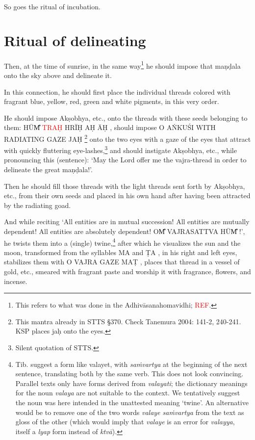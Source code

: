 \documentclass[11pt]{book}
\makeatletter
\def\fakesc#1{%
  \begingroup%
  \xdef\fake@name{\csname\curr@fontshape/\f@size\endcsname}%
  \fontsize{1.3\fontdimen8\fake@name}{\baselineskip}\selectfont%
  \uppercase{#1}%
  \endgroup%
}
\newcommand{\mantra}[1]{\fakesc{#1}}
\newcommand{\red}[1]{\textcolor{red}{#1}}
\newcommand{\skt}[1]{\emph{#1}}
\makeatother
\begin{document}
So goes the ritual of incubation.

\section{Ritual of delineating}

Then, at the time of sunrise, in the same way\footnote{This refers to what was done in the Adhivāsanahomavidhi; \red{REF}.} he should impose that maṇḍala onto the sky above and delineate it. 

In this connection, he should first place the individual threads colored with fragrant blue, yellow, red, green and white pigments, in this very order. 

He should impose Akṣobhya, etc., onto the threads with these seeds belonging to them: \mantra{hūm̐ \red{traḥ} %
 hrīḥ aḥ āḥ}, should impose \mantra{o aṅkuśi with radiating gaze jaḥ}\footnote{This mantra already in STTS §370. Check Tanemura 2004: 141-2, 240-241. KSP places jaḥ onto the eyes.} onto the two eyes with a gaze of the eyes that attract with quickly fluttering eye-lashes,\footnote{Silent quotation of STTS.} and should instigate Akṣobhya, etc.,  while pronouncing this (sentence): `May the Lord offer me the vajra-thread in order to delineate the great maṇḍala!'.
 
Then he should fill those threads with the light threads sent forth by Akṣobhya, etc., from their own seeds and placed in his own hand after having been attracted by the radiating goad.
 
 And while reciting `All entities are in mutual succession! All entities are mutually dependent! All entities are absolutely dependent! \mantra{om̐ vajrasattva hūm̐}!', he twists them into a (single) twine,\footnote{Tib. suggest a form like valayet, with \skt{saṁvartya} at the beginning of the next sentence, translating both by the same verb. This does not look convincing. Parallel texts only have forms derived from \skt{valayati}; the dictionary meanings for the noun \skt{valaya} are not suitable to the context. We tentatively suggest the noun was here intended in the unattested meaning `twine'. An alternative would be to remove one of the two words \skt{valaye saṁvartya} from the text as gloss of the other (which would imply that \skt{valaye} is an error for \skt{valayya}, itself a \skt{lyap} form instead of \skt{ktvā}).} after which he visualizes the sun and the moon, transformed from the syllables \mantra{ma} and \mantra{ṭa}, in his right and left eyes, stabilizes them with \mantra{o vajra gaze maṭ}, places that thread in a vessel of gold, etc., smeared with fragrant paste and worship it with fragrance, flowers, and incense. 
 
\end{document}
